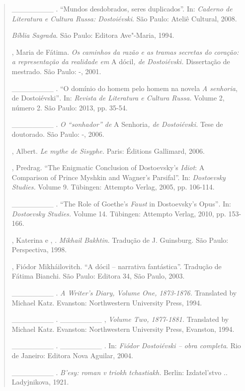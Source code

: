{\begin{quote}
\begin{Parskip}
\_\_\_\_\_\_\_\_ . ``Mundos desdobrados, seres duplicados''. In:
\emph{Caderno de Literatura e Cultura Russa: Dostoiévski}. São Paulo:
Ateliê Cultural, 2008.

\emph{Bíblia Sagrada}. São Paulo: Editora Ave"-Maria, 1994.

, Maria de Fátima. \emph{Os caminhos da razão e as tramas
secretas do coração: a representação da realidade em} A dócil\emph{, de
Dostoiévski.} Dissertação de mestrado. São Paulo: -, 2001.

\_\_\_\_\_\_\_\_ . ``O domínio do homem pelo homem na novela \emph{A
senhoria}, de Dostoiévski''\emph{.} In: \emph{Revista de Literatura e
Cultura Russa.} Volume 2, número 2. São Paulo: 2013, pp. 35-54.

\_\_\_\_\_\_\_\_ . \emph{O ``sonhador'' de} A Senhoria\emph{, de
Dostoiévski.} Tese de doutorado. São Paulo: -, 2006.

, Albert. \emph{Le mythe de Sisyphe.} Paris: Éditions Gallimard,
2006.

, Predrag. ``The Enigmatic Conclusion of Dostoevsky's
\emph{Idiot}: A Comparison of Prince Myshkin and Wagner's Parsifal''.
In: \emph{Dostoevsky Studies.} Volume 9. Tübingen: Attempto Verlag,
2005, pp. 106-114.

\_\_\_\_\_\_\_\_ . ``The Role of Goethe's \emph{Faust} in Dostoevsky's
Opus''\emph{.} In: \emph{Dostoevsky Studies.} Volume 14. Tübingen:
Attempto Verlag, 2010, pp. 153-166.

, Katerina e , . \emph{Mikhail Bakhtin}. Tradução de
J. Guinsburg. São Paulo: Perspectiva, 1998.

, Fiódor Mikháilovitch. ``A dócil -- narrativa fantástica''.
Tradução de Fátima Bianchi. São Paulo: Editora 34, São Paulo, 2003.

\_\_\_\_\_\_\_\_ . \emph{A Writer's Diary, Volume One, 1873-1876.}
Translated by Michael Katz. Evanston: Northwestern University Press,
1994.

\_\_\_\_\_\_\_\_ . \_\_\_\_\_\_\_\_ , \emph{Volume Two, 1877-1881.}
Translated by Michael Katz. Evanston: Northwestern University Press,
Evanston, 1994.

\_\_\_\_\_\_\_\_ . \_\_\_\_\_\_\_\_ . In: \emph{Fiódor Dostoiévski --
obra completa}. Rio de Janeiro: Editora Nova Aguilar, 2004.

\_\_\_\_\_\_\_\_ . \emph{B'esy: roman v triokh tchastiakh.} Berlin:
Izdatel'stvo .. Ladyjnikova, 1921.


\end{Parskip}
\end{quote}}
